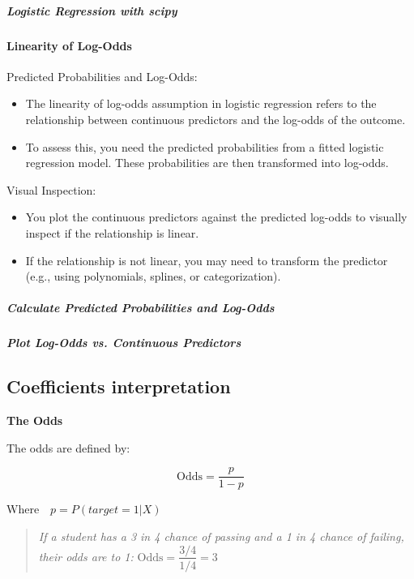 \documentclass{article}
\providecommand{\tightlist}{%
  \setlength{\itemsep}{0pt}\setlength{\parskip}{0pt}}
\begin{document}
\subparagraph{Logistic Regression with
scipy}\label{logistic-regression-with-scipy}

\paragraph{\texorpdfstring{\textbf{Linearity of
Log-Odds}}{Linearity of Log-Odds}}\label{linearity-of-log-odds}

Predicted Probabilities and Log-Odds:

\begin{itemize}
\tightlist
\item
  The linearity of log-odds assumption in logistic regression refers to
  the relationship between continuous predictors and the log-odds of the
  outcome.
\item
  To assess this, you need the predicted probabilities from a fitted
  logistic regression model. These probabilities are then transformed
  into log-odds.
\end{itemize}

Visual Inspection:

\begin{itemize}
\tightlist
\item
  You plot the continuous predictors against the predicted log-odds to
  visually inspect if the relationship is linear.
\item
  If the relationship is not linear, you may need to transform the
  predictor (e.g., using polynomials, splines, or categorization).
\end{itemize}

\subparagraph{Calculate Predicted Probabilities and
Log-Odds}\label{calculate-predicted-probabilities-and-log-odds}

\subparagraph{Plot Log-Odds vs. Continuous
Predictors}\label{plot-log-odds-vs-continuous-predictors}

\subsection{Coefficients
interpretation}\label{coefficients-interpretation}

\textbf{The Odds}

The odds are defined by:

\[\text{Odds} = \dfrac{p}{1-p}\]

\(\text{Where} \quad p = P(target=1|X)\)

\begin{quote}
\emph{If a student has a 3 in 4 chance of passing and a 1 in 4 chance of
failing, their odds are  to 1\textquotesingle:}
\(\text{Odds} = \dfrac{3/4}{1/4}=3\)
\end{quote}
\end{document}
